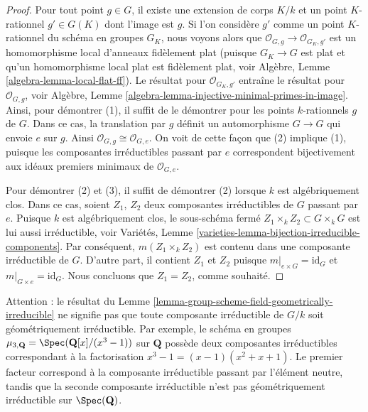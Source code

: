 \begin{proof}
Pour tout point $g \in G$, il existe une extension de corps
$K/k$ et un point $K$-rationnel $g' \in G(K)$ dont l'image est
$g$. Si l'on considère $g'$ comme un point $K$-rationnel du
schéma en groupes $G_K$, nous voyons alors que
$\mathcal{O}_{G, g} \to \mathcal{O}_{G_K, g'}$ est un homomorphisme local
d'anneaux fidèlement plat (puisque $G_K \to G$ est plat et qu'un homomorphisme
local plat est fidèlement plat, voir
Algèbre, Lemme \ref{algebra-lemma-local-flat-ff}).
Le résultat pour $\mathcal{O}_{G_K, g'}$ entraîne le
résultat pour $\mathcal{O}_{G, g}$, voir
Algèbre, Lemme \ref{algebra-lemma-injective-minimal-primes-in-image}.
Ainsi, pour démontrer (1), il suffit de
le démontrer pour les points $k$-rationnels $g$ de $G$. Dans ce cas,
la translation par $g$ définit un automorphisme $G \to G$
qui envoie $e$ sur $g$. Ainsi $\mathcal{O}_{G, g} \cong \mathcal{O}_{G, e}$.
On voit de cette façon que (2) implique (1), puisque les composantes irréductibles
passant par $e$ correspondent bijectivement aux idéaux premiers minimaux
de $\mathcal{O}_{G, e}$.

\medskip\noindent
Pour démontrer (2) et (3), il suffit de démontrer (2) lorsque $k$
est algébriquement clos. Dans ce cas, soient $Z_1$, $Z_2$ deux
composantes irréductibles de $G$ passant par $e$.
Puisque $k$ est algébriquement clos, le sous-schéma fermé
$Z_1 \times_k Z_2 \subset G \times_k G$ est lui aussi irréductible, voir
Variétés, Lemme \ref{varieties-lemma-bijection-irreducible-components}.
Par conséquent, $m(Z_1 \times_k Z_2)$ est contenu dans une composante irréductible
de $G$. D'autre part, il contient
$Z_1$ et $Z_2$ puisque $m|_{e \times G} = \text{id}_G$ et
$m|_{G \times e} = \text{id}_G$. Nous concluons que $Z_1 = Z_2$, comme souhaité.
\end{proof}

\begin{remark}
\label{remark-warning-group-scheme-geometrically-irreducible}
Attention : le résultat du
Lemme \ref{lemma-group-scheme-field-geometrically-irreducible}
ne signifie pas que toute composante irréductible de $G/k$ soit
géométriquement irréductible. Par exemple, le schéma en groupes
$\mu_{3, \mathbf{Q}} = \Spec(\mathbf{Q}[x]/(x^3 - 1))$
sur $\mathbf{Q}$ possède deux composantes irréductibles correspondant
à la factorisation $x^3 - 1 = (x - 1)(x^2 + x + 1)$.
Le premier facteur correspond à la composante irréductible
passant par l'élément neutre, tandis que la seconde composante irréductible
n'est pas géométriquement irréductible sur $\Spec(\mathbf{Q})$.
\end{remark}

